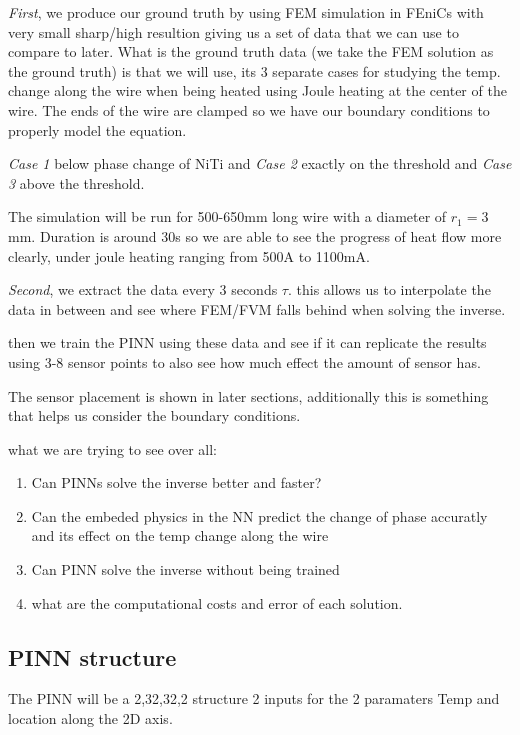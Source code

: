 \documentclass[12pt, a4paper]{article}
\begin{document}
\emph{First}, we produce our ground truth by using FEM simulation in FEniCs with very small sharp/high resultion giving
 us a set of data that we can use to compare to later. What is the ground truth data (we take the FEM 
 solution as the ground truth) is that we will use, its 3 separate cases for studying the temp. 
 change along the wire when being heated using Joule heating at the center of the wire. 
 The ends of the wire are clamped so we have our boundary conditions to properly model the equation. 

\emph{Case 1} below phase change of NiTi and \emph{Case 2} exactly on the threshold and \emph{Case 3} above the threshold. 

The simulation will be run for 500-650mm long wire with a diameter of  $r_1 = 3$mm. 
Duration is around 30s so we are able to see the progress of heat flow more clearly,
 under joule heating ranging from 500A to 1100mA. 

\emph{Second}, we extract the data every 3 seconds $\tau$. this allows us to interpolate the data in
 between and see where FEM/FVM falls behind when solving the inverse.

then we train the PINN using these data and see if it can replicate the results 
using 3-8 sensor points to also see how much effect the amount of sensor has. 

The sensor placement is shown in later sections, additionally this is something that helps us consider the boundary conditions. 


what we are trying to see over all:
\begin{enumerate}
    \item Can PINNs solve the inverse better and faster?
    \item Can the embeded physics in the NN predict the change of phase accuratly and its effect on the temp change along the wire
    \item Can PINN solve the inverse without being trained
    \item what are the computational costs and error of each solution.
\end{enumerate}

\subsection{PINN structure}

The PINN will be a 2,32,32,2 structure 2 inputs for the 2 paramaters Temp and location along the 2D axis. 
\end{document}
